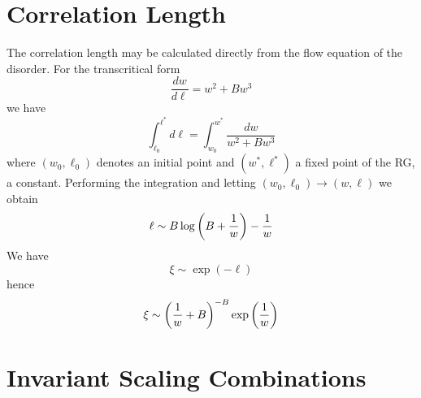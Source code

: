 \documentclass[reprint,amsmath,amssymb,aps,floatfix]{revtex4-1}
\begin{document}
\section{\label{app:correlation} Correlation Length}
The correlation length may be calculated directly from the flow equation of the disorder. For the transcritical form
%
\begin{equation}
	\frac{dw}{d\ell} = w^2+B w^3
\end{equation}
%
\noindent we have
%
\begin{equation}
	\int_{\ell_0}^{\ell^*}d\ell = \int_{w_0}^{w^*}\frac{dw}{w^2+B w^3}
\end{equation}
%
\noindent where $(w_0,\ell_0)$ denotes an initial point and $(w^*, \ell^*)$ a fixed point of the RG, a constant. Performing the integration and letting $(w_0,\ell_0)\rightarrow(w,\ell)$ we obtain
%
\begin{equation}
	\ell \sim B\log\bigg{(}B+\frac{1}{w}\bigg{)}-\frac{1}{w}
\end{equation}
%
\noindent We have
%
\begin{equation}
	\xi\sim \exp(-\ell)
\end{equation}
%
\noindent hence
%
\begin{equation}
	\xi\sim\bigg{(}\frac{1}{w}+B\bigg{)}^{-B}\exp\bigg{(}\frac{1}{w}\bigg{)}
\end{equation}


\section{\label{app:invariant} Invariant Scaling Combinations}
\end{document}
